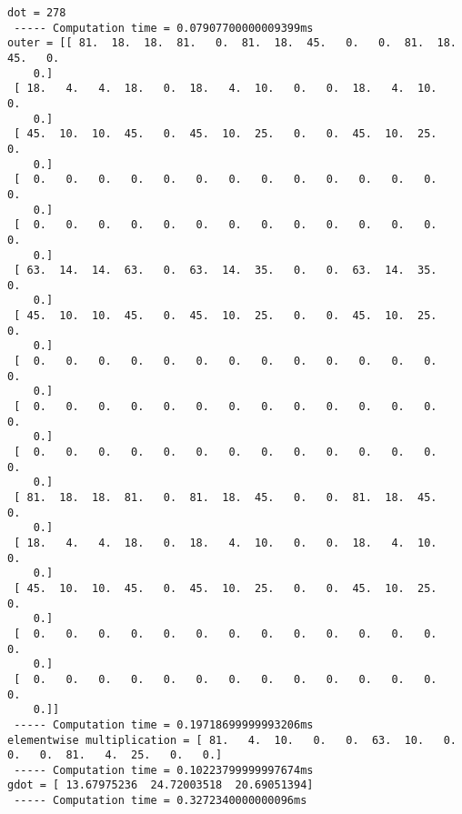 \documentclass[11pt]{article}
\begin{document}
    \begin{Verbatim}[commandchars=\\\{\}]
dot = 278
 ----- Computation time = 0.07907700000009399ms
outer = [[ 81.  18.  18.  81.   0.  81.  18.  45.   0.   0.  81.  18.  45.   0.
    0.]
 [ 18.   4.   4.  18.   0.  18.   4.  10.   0.   0.  18.   4.  10.   0.
    0.]
 [ 45.  10.  10.  45.   0.  45.  10.  25.   0.   0.  45.  10.  25.   0.
    0.]
 [  0.   0.   0.   0.   0.   0.   0.   0.   0.   0.   0.   0.   0.   0.
    0.]
 [  0.   0.   0.   0.   0.   0.   0.   0.   0.   0.   0.   0.   0.   0.
    0.]
 [ 63.  14.  14.  63.   0.  63.  14.  35.   0.   0.  63.  14.  35.   0.
    0.]
 [ 45.  10.  10.  45.   0.  45.  10.  25.   0.   0.  45.  10.  25.   0.
    0.]
 [  0.   0.   0.   0.   0.   0.   0.   0.   0.   0.   0.   0.   0.   0.
    0.]
 [  0.   0.   0.   0.   0.   0.   0.   0.   0.   0.   0.   0.   0.   0.
    0.]
 [  0.   0.   0.   0.   0.   0.   0.   0.   0.   0.   0.   0.   0.   0.
    0.]
 [ 81.  18.  18.  81.   0.  81.  18.  45.   0.   0.  81.  18.  45.   0.
    0.]
 [ 18.   4.   4.  18.   0.  18.   4.  10.   0.   0.  18.   4.  10.   0.
    0.]
 [ 45.  10.  10.  45.   0.  45.  10.  25.   0.   0.  45.  10.  25.   0.
    0.]
 [  0.   0.   0.   0.   0.   0.   0.   0.   0.   0.   0.   0.   0.   0.
    0.]
 [  0.   0.   0.   0.   0.   0.   0.   0.   0.   0.   0.   0.   0.   0.
    0.]]
 ----- Computation time = 0.19718699999993206ms
elementwise multiplication = [ 81.   4.  10.   0.   0.  63.  10.   0.   0.   0.  81.   4.  25.   0.   0.]
 ----- Computation time = 0.10223799999997674ms
gdot = [ 13.67975236  24.72003518  20.69051394]
 ----- Computation time = 0.3272340000000096ms

    \end{Verbatim}
\end{document}
